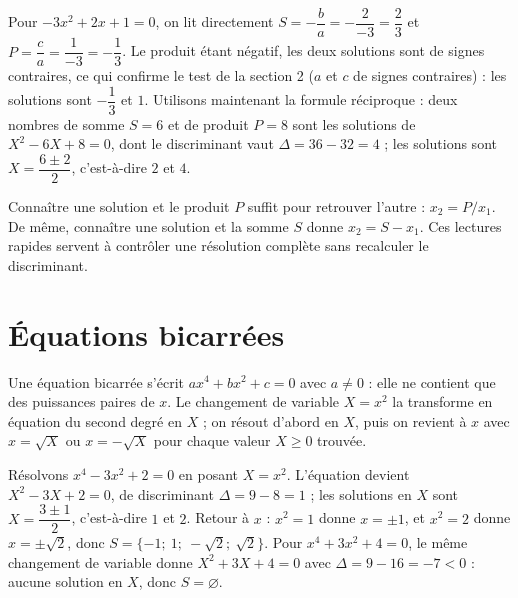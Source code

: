 \begin{exemple}
Pour $-3x^{2} + 2x + 1 = 0$, on lit directement $S = -\dfrac{b}{a} = -\dfrac{2}{-3} = \dfrac{2}{3}$ et $P = \dfrac{c}{a} = \dfrac{1}{-3} = -\dfrac{1}{3}$. Le produit étant négatif, les deux solutions sont de signes contraires, ce qui confirme le test de la section 2 ($a$ et $c$ de signes contraires) : les solutions sont $-\dfrac{1}{3}$ et $1$. Utilisons maintenant la formule réciproque : deux nombres de somme $S = 6$ et de produit $P = 8$ sont les solutions de $X^{2} - 6X + 8 = 0$, dont le discriminant vaut $\Delta = 36 - 32 = 4$ ; les solutions sont $X = \dfrac{6 \pm 2}{2}$, c'est-à-dire $2$ et $4$.
\end{exemple}

\begin{remarque}
Connaître une solution et le produit $P$ suffit pour retrouver l'autre : $x_{2} = P / x_{1}$. De même, connaître une solution et la somme $S$ donne $x_{2} = S - x_{1}$. Ces lectures rapides servent à contrôler une résolution complète sans recalculer le discriminant.
\end{remarque}

\section{Équations bicarrées}

\begin{definition}
Une équation bicarrée s'écrit $ax^{4} + bx^{2} + c = 0$ avec $a \neq 0$ : elle ne contient que des puissances paires de $x$. Le changement de variable $X = x^{2}$ la transforme en équation du second degré en $X$ ; on résout d'abord en $X$, puis on revient à $x$ avec $x = \sqrt{X}$ ou $x = -\sqrt{X}$ pour chaque valeur $X \geq 0$ trouvée.
\end{definition}

\begin{exemple}
Résolvons $x^{4} - 3x^{2} + 2 = 0$ en posant $X = x^{2}$. L'équation devient $X^{2} - 3X + 2 = 0$, de discriminant $\Delta = 9 - 8 = 1$ ; les solutions en $X$ sont $X = \dfrac{3 \pm 1}{2}$, c'est-à-dire $1$ et $2$. Retour à $x$ : $x^{2} = 1$ donne $x = \pm 1$, et $x^{2} = 2$ donne $x = \pm\sqrt{2}$, donc $S = \{-1;\ 1;\ -\sqrt{2};\ \sqrt{2}\}$. Pour $x^{4} + 3x^{2} + 4 = 0$, le même changement de variable donne $X^{2} + 3X + 4 = 0$ avec $\Delta = 9 - 16 = -7 < 0$ : aucune solution en $X$, donc $S = \varnothing$.
\end{exemple}

